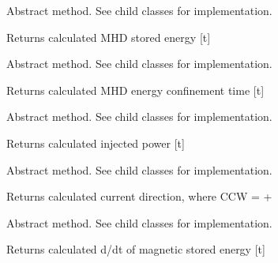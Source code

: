 \documentclass[letterpaper,10pt,english]{sphinxmanual}
\begin{document}
\begin{fulllineitems}
\begin{fulllineitems}
\label{eqtools:eqtools.core.Equilibrium.getWMHD}
Abstract method.  See child classes for implementation.

Returns calculated MHD stored energy {[}t{]}

\end{fulllineitems}


\begin{fulllineitems}
\label{eqtools:eqtools.core.Equilibrium.getTauMHD}
Abstract method.  See child classes for implementation.

Returns calculated MHD energy confinement time {[}t{]}

\end{fulllineitems}


\begin{fulllineitems}
\label{eqtools:eqtools.core.Equilibrium.getPinj}
Abstract method.  See child classes for implementation.

Returns calculated injected power {[}t{]}

\end{fulllineitems}


\begin{fulllineitems}
\label{eqtools:eqtools.core.Equilibrium.getCurrentSign}
Abstract method.  See child classes for implementation.

Returns calculated current direction, where CCW = +

\end{fulllineitems}


\begin{fulllineitems}
\label{eqtools:eqtools.core.Equilibrium.getWbdot}
Abstract method.  See child classes for implementation.

Returns calculated d/dt of magnetic stored energy {[}t{]}

\end{fulllineitems}


\end{fulllineitems}
\end{document}
